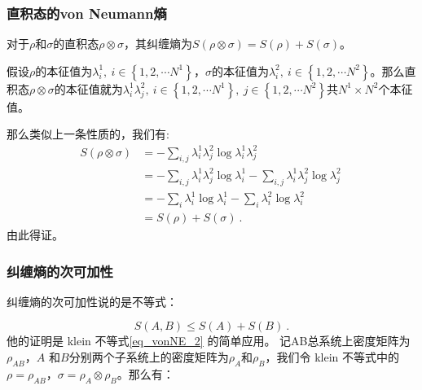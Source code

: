 \subsubsection{直积态的von Neumann熵}

对于$\rho$和$\sigma$的直积态$\rho\otimes\sigma$，其纠缠熵为$S\left(\rho\otimes \sigma\right) = S\left(\rho\right) + S\left(\sigma\right)$。

假设$\rho$的本征值为$\lambda_i^1,~i\in \left\{1,2,\cdots N^1\right\}$，$\sigma$的本征值为$\lambda_i^2,~i \in \left\{1,2,\cdots N^2\right\}$。那么直积态$\rho\otimes \sigma$的本征值就为$\lambda_i^1\lambda_j^2,~i\in\left\{1,2,\cdots N^1\right\},~j\in\left\{1,2,\cdots N^2\right\}$共$N^1\times N^2$个本征值。

那么类似上一条性质的，我们有:
\begin{equation}
\begin{aligned}
S\left(\rho\otimes\sigma\right) &= -\sum_{i,j}\lambda_i^1\lambda_j^2\log\lambda_i^1\lambda_j^2 \\
&= -\sum_{i,j}\lambda_i^1\lambda_j^2\log\lambda_i^1 - \sum_{i,j}\lambda_i^1\lambda_j^2\log\lambda_j^2 \\
&= -\sum_i \lambda_i^1\log\lambda_i^1 - \sum_i\lambda_i^2\log\lambda_i^2 \\
&= S\left(\rho\right) + S\left(\sigma\right)~.
\end{aligned}~
\end{equation}
由此得证。

\subsubsection{纠缠熵的次可加性}

纠缠熵的次可加性说的是不等式：

\begin{equation}
S\left(A,B\right) \leqslant S\left(A\right) + S\left(B\right) ~.
\end{equation}
他的证明是 klein 不等式\autoref{eq_vonNE_2} 的简单应用。 记AB总系统上密度矩阵为$\rho_{AB}$，$A$
和$B$分别两个子系统上的密度矩阵为$\rho_A$和$\rho_B$，我们令 klein 不等式中的$\rho = \rho_{AB}$，$\sigma = \rho_A\otimes \rho_B$。那么有：

